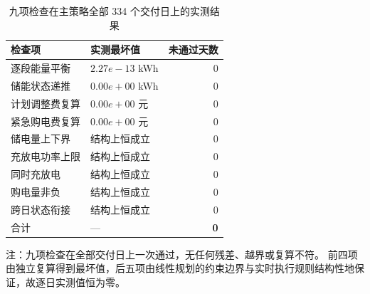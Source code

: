 \begin{table}[htbp]
  \centering
  \caption{九项检查在主策略全部 334 个交付日上的实测结果}
  \label{tab:p3-check}
  \footnotesize
  \begin{tabular}{llr}
    \toprule
    检查项 & 实测最坏值 & 未通过天数 \\
    \midrule
    逐段能量平衡 & $2.27e-13$ kWh & 0 \\
    储能状态递推 & $0.00e+00$ kWh & 0 \\
    计划调整费复算 & $0.00e+00$ 元 & 0 \\
    紧急购电费复算 & $0.00e+00$ 元 & 0 \\
    储电量上下界 & 结构上恒成立 & 0 \\
    充放电功率上限 & 结构上恒成立 & 0 \\
    同时充放电 & 结构上恒成立 & 0 \\
    购电量非负 & 结构上恒成立 & 0 \\
    跨日状态衔接 & 结构上恒成立 & 0 \\
    \midrule
    合计 & --- & \textbf{0} \\
    \bottomrule
  \end{tabular}
  \par\vspace{2pt}
  \begin{minipage}{.92\textwidth}\footnotesize
    注：九项检查在全部交付日上一次通过，无任何残差、越界或复算不符。
    前四项由独立复算得到最坏值，后五项由线性规划的约束边界与实时执行规则结构性地保证，故逐日实测值恒为零。
  \end{minipage}
\end{table}
